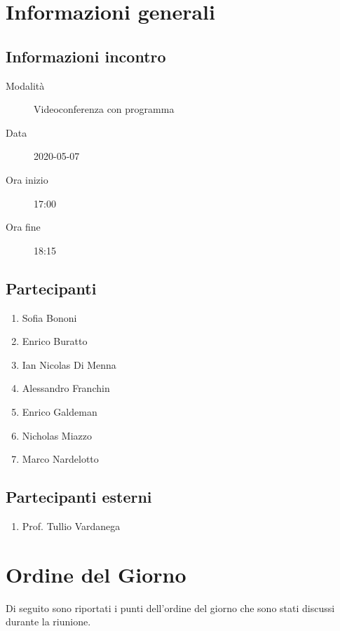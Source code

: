 \documentclass{article}
\begin{document}


\section{Informazioni generali}%
\label{sec:informazioni_generali}

\subsection{Informazioni incontro}%
\label{sub:informazioni_incontro}

\begin{description}
  \item[Modalità] Videoconferenza con programma 
  \item[Data] 2020-05-07
  \item[Ora inizio] 17:00
  \item[Ora fine] 18:15
\end{description}

\subsection{Partecipanti}%
\label{sub:partecipanti}

\begin{enumerate}
  \item Sofia Bononi
  \item Enrico Buratto
  \item Ian Nicolas Di Menna
  \item Alessandro Franchin
  \item Enrico Galdeman
  \item Nicholas Miazzo
  \item Marco Nardelotto
\end{enumerate}

\subsection{Partecipanti esterni}%
\label{sub:partecipanti esterni}

\begin{enumerate}
    \item Prof. Tullio Vardanega
\end{enumerate}


\section{Ordine del Giorno}%
\label{ordine_del_giorno}
Di seguito sono riportati i punti dell'ordine del giorno che sono stati discussi durante la riunione.
\begin{enumerate}

\end{enumerate}
\end{document}

